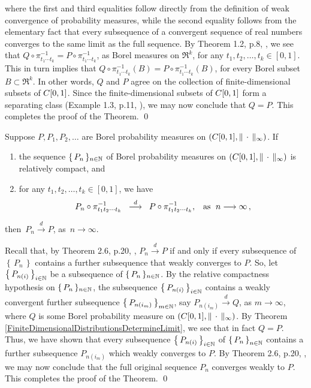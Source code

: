 where the first and third equalities follow directly from the definition of weak convergence of probability
measures, while the second equality follows from the elementary fact that every subsequence of a
convergent sequence of real numbers converges to the same limit as the full sequence.
By Theorem 1.2, p.8, \cite{Billingsley1999}, we see that
$Q\circ\pi_{t_{1}\cdots t_{k}}^{-1} = P\circ\pi_{t_{1}\cdots t_{k}}^{-1}$,
as Borel measures on $\Re^{k}$, for any $t_{1}, t_{2}, \ldots, t_{k} \in [0,1]$.
This in turn implies that $Q\circ\pi_{t_{1}\cdots t_{k}}^{-1}(B) = P\circ\pi_{t_{1}\cdots t_{k}}^{-1}(B)$,
for every Borel subset $B \subset \Re^{k}$.
In other words, $Q$ and $P$ agree on the collection of finite-dimensional subsets of $C[0,1]$.
Since the finite-dimensional subsets of $C[0,1]$ form a separating class
(Example 1.3, p.11, \cite{Billingsley1999}), we may now conclude that $Q = P$.
This completes the proof of the Theorem.
\qed

\begin{theorem}
\mbox{}\vskip 0.1cm
\noindent
Suppose $P, P_{1}, P_{2}, \ldots $ are Borel probability measures on $\left(C[0,1],\Vert\,\cdot\,\Vert_{\infty}\right)$.
If
\begin{enumerate}
\item	the sequence $\{\,P_{n}\,\}_{n\in\mathbb{N}}$ of Borel probability measures
		on $\left(C[0,1],\Vert\,\cdot\,\Vert_{\infty}\right)$ is relatively compact, and
\item	for any $t_{1}, t_{2}, \ldots, t_{k} \in [0,1]$, we have
		\begin{equation*}
		P_{n}\circ\pi_{t_{1}t_{2}\cdots t_{k}}^{-1}
		\;\;\overset{d}{\longrightarrow}\;\;
		P\circ\pi_{t_{1}t_{2}\cdots t_{k}}^{-1},
		\;\;\;
		\textnormal{as \;$n \longrightarrow \infty$}\,,
		\end{equation*}
\end{enumerate}
then \,$P_{n} \overset{d}{\longrightarrow} P$, as \,$n \longrightarrow \infty$.
\end{theorem}
\proof
Recall that, by Theorem 2.6, p.20, \cite{Billingsley1999}, $P_{n} \overset{d}{\longrightarrow} P$ if and only if
every subsequence of $\left\{\,P_{n}\,\right\}$ contains a further subsequence that weakly converges to $P$.
So, let $\left\{\,P_{n(i)}\,\right\}_{i\in\mathbb{N}}$ be a subsequence of $\{\,P_{n}\,\}_{n\in\mathbb{N}}$.
By the relative compactness hypothesis on $\{\,P_{n}\,\}_{n\in\mathbb{N}}$, the subsequence
$\left\{\,P_{n(i)}\,\right\}_{i\in\mathbb{N}}$ contains a weakly convergent further subsequence
$\left\{\,P_{n(i_{m})}\,\right\}_{m\in\mathbb{N}}$,
say $P_{n(i_{m})} \overset{d}{\longrightarrow} Q$, as $m \longrightarrow \infty$,
where $Q$ is some Borel probability measure on $\left(C[0,1],\Vert\,\cdot\,\Vert_{\infty}\right)$.
By Theorem \ref{FiniteDimensionalDistributionsDetermineLimit}, we see that in fact $Q = P$.
Thus, we have shown that every subsequence $\left\{\,P_{n(i)}\,\right\}_{i\in\mathbb{N}}$ of
$\left\{\,P_{n}\,\right\}_{n\in\mathbb{N}}$ contains a further subsequence $P_{n(i_{m})}$
which weakly converges to $P$.
By Theorem 2.6, p.20, \cite{Billingsley1999}, we may now conclude that the full original
sequence $P_{n}$ converges weakly to $P$. This completes the proof of the Theorem.
\qed

